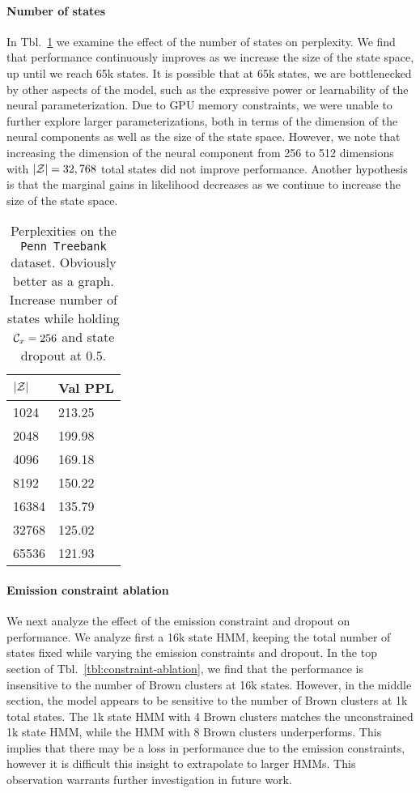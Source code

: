 \documentclass[11pt,a4paper]{article}
\begin{document}
\paragraph{Number of states}
In Tbl.~\ref{tbl:states-ablation} we examine the effect of the 
number of states on perplexity.
We find that performance continuously improves as we increase
the size of the state space, up until we reach 65k states.
It is possible that at 65k states, we are bottlenecked by
other aspects of the model, such as the expressive power
or learnability of the neural parameterization. 
Due to GPU memory constraints, we were unable to further
explore larger parameterizations, both 
in terms of the dimension of the neural components as well as 
the size of the state space.
However, we note that increasing the dimension of the neural component from 256 to
512 dimensions with $|\mathcal{Z}| = 32,768$ total states did not improve performance.
Another hypothesis is that the marginal gains in likelihood
decreases as we continue to increase the size of the state space.

\begin{table}[!t]
\centering
\caption{\label{tbl:states-ablation}
Perplexities on the \texttt{Penn Treebank} dataset.
Obviously better as a graph.
Increase number of states while holding $\mathcal{C}_x=256$
and state dropout at 0.5.
}
\begin{tabular}{ll}
\toprule
$|\mathcal{Z}|$ & Val PPL\\
\midrule
1024 & 213.25\\
2048 & 199.98\\
4096 & 169.18\\
8192 & 150.22\\
16384 & 135.79\\
32768 & 125.02\\
65536 & 121.93\\
\bottomrule
\end{tabular}
\end{table}


\paragraph{Emission constraint ablation}
We next analyze the effect of the emission constraint and dropout on performance.
We analyze first a 16k state HMM, keeping the total number of states fixed
while varying the emission constraints and dropout.
In the top section of Tbl.~\ref{tbl:constraint-ablation},
we find that the performance is
insensitive to the number of Brown clusters at 16k states.
However, in the middle section,
the model appears to be sensitive to the number of Brown clusters
at 1k total states. 
The 1k state HMM with 4 Brown clusters matches the unconstrained 1k state HMM,
while the HMM with 8 Brown clusters underperforms.
This implies that there may be a loss in performance due to the emission
constraints, however it is difficult this insight
to extrapolate to larger HMMs.
This observation warrants further investigation in future work.
\end{document}
